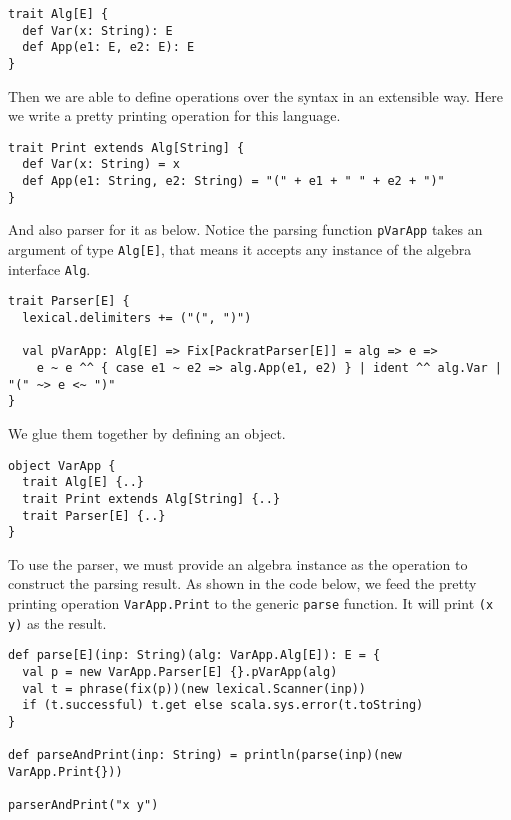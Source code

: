 \begin{lstlisting}
trait Alg[E] {
  def Var(x: String): E
  def App(e1: E, e2: E): E
}
\end{lstlisting}

Then we are able to define operations over the syntax in an extensible way. Here we write a pretty printing operation for this language.

\begin{lstlisting}
trait Print extends Alg[String] {
  def Var(x: String) = x
  def App(e1: String, e2: String) = "(" + e1 + " " + e2 + ")"
}
\end{lstlisting}

And also parser for it as below. Notice the parsing function \lstinline{pVarApp} takes an argument of type \lstinline{Alg[E]}, that means it accepts any instance of the algebra interface \lstinline{Alg}.

\begin{lstlisting}
trait Parser[E] {
  lexical.delimiters += ("(", ")")

  val pVarApp: Alg[E] => Fix[PackratParser[E]] = alg => e =>
    e ~ e ^^ { case e1 ~ e2 => alg.App(e1, e2) } | ident ^^ alg.Var | "(" ~> e <~ ")"
}
\end{lstlisting}

We glue them together by defining an object.

\begin{lstlisting}
object VarApp {
  trait Alg[E] {..}
  trait Print extends Alg[String] {..}
  trait Parser[E] {..}
}
\end{lstlisting}

To use the parser, we must provide an algebra instance as the operation to construct the parsing result. As shown in the code below, we feed the pretty printing operation \lstinline{VarApp.Print} to the generic \lstinline{parse} function. It will print \lstinline{(x y)} as the result.

\begin{lstlisting}
def parse[E](inp: String)(alg: VarApp.Alg[E]): E = {
  val p = new VarApp.Parser[E] {}.pVarApp(alg)
  val t = phrase(fix(p))(new lexical.Scanner(inp))
  if (t.successful) t.get else scala.sys.error(t.toString)
}

def parseAndPrint(inp: String) = println(parse(inp)(new VarApp.Print{}))

parserAndPrint("x y")
\end{lstlisting}


